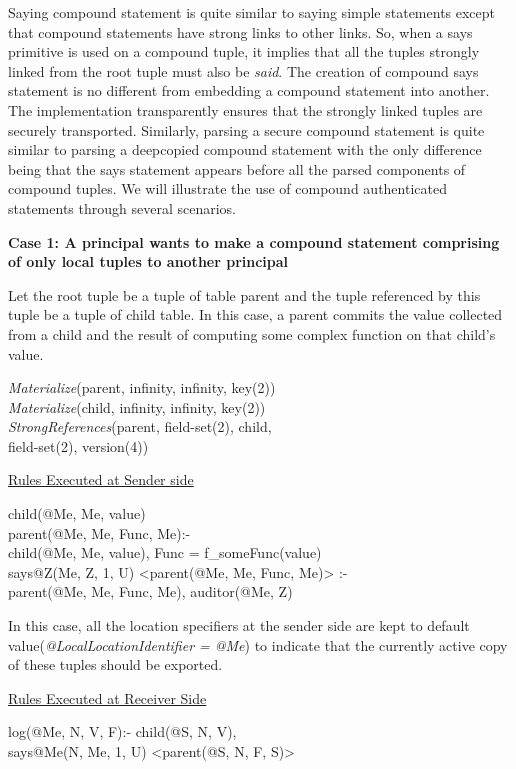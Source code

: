 Saying compound statement is quite similar to saying simple statements except that compound statements have strong links to other links. So, when a says primitive is used on a compound tuple, it implies that all the tuples strongly linked from the root tuple must also be {\em said}. The creation of compound says statement is no different from embedding a compound statement into another. The implementation transparently ensures that the strongly linked tuples are securely transported. Similarly, parsing a secure compound statement is quite similar to parsing a deepcopied compound statement with the only difference being that the says statement appears before all the parsed components of compound tuples. We will illustrate the use of compound authenticated statements through several scenarios.

\noindent\textbf{Case 1: A principal wants to make a compound statement comprising of only local tuples to another principal }

Let the root tuple be a tuple of table parent and the tuple referenced by this tuple be a tuple of child table. In this case, a parent commits the value collected from a child and the result of computing some complex function on that child's value.

\begin{code}
\textit{Materialize}(parent, infinity, infinity, key(2))\\
\textit{Materialize}(child, infinity, infinity, key(2))\\
\textit{StrongReferences}(parent, field-set(2), child, \\
\> field-set(2), version(4))
\end{code}

\noindent\underline{Rules Executed at Sender side}
\begin{code}
child(@Me, Me, value) \\
parent(@Me, Me, Func, Me):- \\
\> child(@Me, Me, value), Func = f\_someFunc(value) \\
says@Z(Me, Z, 1, U) <parent(@Me, Me, Func, Me)> :- \\
\> parent(@Me, Me,  Func, Me), auditor(@Me, Z)
\end{code}

In this case, all the location specifiers at the sender side are kept to default value(\textit{@LocalLocationIdentifier = @Me}) to indicate that the currently active copy of these tuples should be exported.

\noindent\underline{Rules Executed at Receiver Side}
\begin{code}
log(@Me, N, V, F):- child(@S, N, V), \\
\> says@Me(N, Me, 1, U) <parent(@S, N, F, S)>
\end{code}

